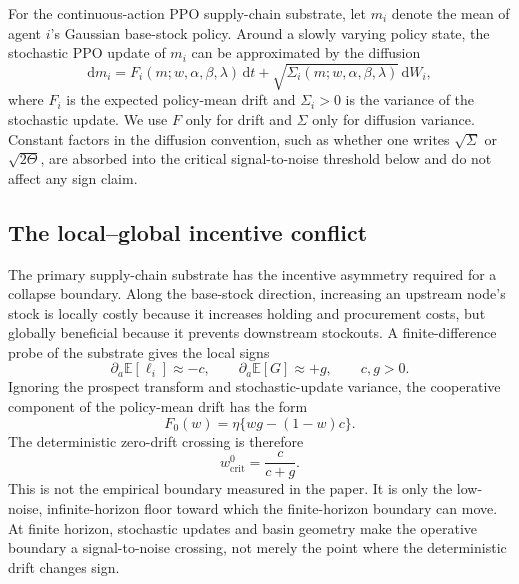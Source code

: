 \documentclass[letterpaper]{article} %
\theoremstyle{plain}
\newcommand{\wcrit}{w_{\mathrm{crit}}}
\begin{document}
For the continuous-action PPO supply-chain substrate, let $m_i$ denote the mean of agent $i$'s
Gaussian base-stock policy. Around a slowly varying policy state, the stochastic PPO update of
$m_i$ can be approximated by the diffusion
\begin{equation}
 \mathrm{d}m_i
 =
 F_i(m;w,\alpha,\beta,\lambda)\,\mathrm{d}t
 +
 \sqrt{\Sigma_i(m;w,\alpha,\beta,\lambda)}\,\mathrm{d}W_i ,
 \label{eq:langevin}
\end{equation}
where $F_i$ is the expected policy-mean drift and $\Sigma_i>0$ is the variance of the stochastic
update. We use $F$ only for drift and $\Sigma$ only for diffusion variance. Constant factors in the
diffusion convention, such as whether one writes $\sqrt{\Sigma}$ or $\sqrt{2\Theta}$, are absorbed
into the critical signal-to-noise threshold below and do not affect any sign claim.

\subsection{The local--global incentive conflict}
The primary supply-chain substrate has the incentive asymmetry required for a collapse boundary.
Along the base-stock direction, increasing an upstream node's stock is locally costly because it
increases holding and procurement costs, but globally beneficial because it prevents downstream
stockouts. A finite-difference probe of the substrate gives the local signs
\begin{equation}
 \partial_a \mathbb{E}[\ell_i]\approx -c,\qquad
 \partial_a \mathbb{E}[G]\approx +g,\qquad c,g>0.
\end{equation}
Ignoring the prospect transform and stochastic-update variance, the cooperative component of the
policy-mean drift has the form
\begin{equation}
 F_0(w)=\eta\{wg-(1-w)c\}.
 \label{eq:drift}
\end{equation}
The deterministic zero-drift crossing is therefore
\begin{equation}
 \wcrit^0=\frac{c}{c+g}.
\end{equation}
This is not the empirical boundary measured in the paper. It is only the low-noise,
infinite-horizon floor toward which the finite-horizon boundary can move. At finite horizon,
stochastic updates and basin geometry make the operative boundary a signal-to-noise crossing, not
merely the point where the deterministic drift changes sign.
\end{document}
